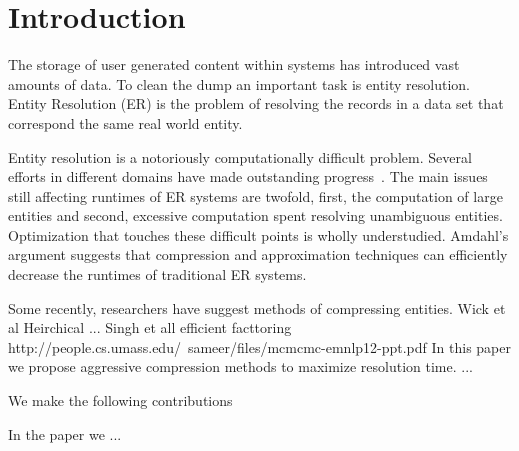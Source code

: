 
\section{Introduction}

The storage of user generated content within systems has introduced 
vast amounts of data.
To clean the dump an important task is entity resolution.
Entity Resolution (ER) is the problem of resolving the records in
a data set that correspond the same real world entity.

Entity resolution is a notoriously computationally difficult problem.
Several efforts in different domains have made outstanding progress~\cite{}.
The main issues still affecting runtimes of ER systems are
twofold, first, the computation of large entities and second, excessive
computation spent resolving unambiguous entities.
Optimization that touches these difficult points is wholly understudied.
Amdahl's argument suggests that compression and approximation 
techniques can efficiently decrease the runtimes of traditional ER systems.

Some recently, researchers have suggest methods of compressing entities.
Wick et al Heirchical ...
Singh et all efficient facttoring http://people.cs.umass.edu/~sameer/files/mcmcmc-emnlp12-ppt.pdf
In this paper we propose aggressive compression methods to maximize resolution time.
...

We make the following contributions

In the paper we ... 




